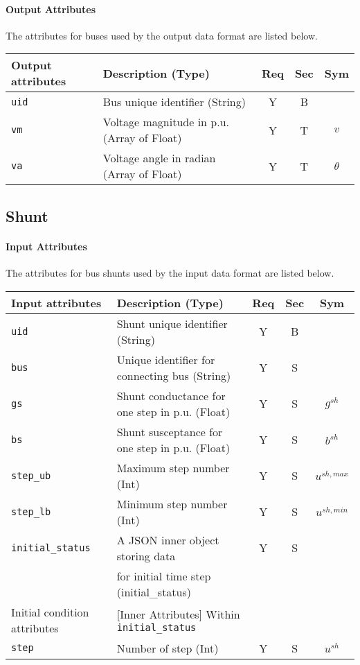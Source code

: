 \documentclass{article}
\begin{document}
\paragraph{Output Attributes} The attributes for buses used by the output data format are listed below.

\begin{center}
\small
\begin{tabular}{ l | l | c | c | c |}
Output attributes & Description (Type) & Req & Sec & Sym\\
\hline
  {\tt uid} & Bus unique identifier (String) & Y & B & \\
  
  {\tt vm} & Voltage magnitude in p.u. (Array of Float)  & Y & T & $v$ \\
  {\tt va} & Voltage angle in radian (Array of Float)  & Y & T & $\theta$\\
\hline
\end{tabular}
\end{center}



\subsection{Shunt}
\label{nom:shunt}
\paragraph{Input Attributes} The attributes for bus shunts used by the input data format are listed below.
\begin{center}
\small

\begin{tabular}{ l | l | c | c | c | }
Input attributes & Description (Type) & Req & Sec & Sym\\
\hline
  {\tt uid} & Shunt unique identifier (String) & Y & B &  \\
  {\tt bus} & Unique identifier for connecting bus (String) & Y & S &  \\   
  {\tt gs}  & Shunt conductance for one step in p.u. (Float) & Y & S & $g^{sh}$ \\  
  {\tt bs}  & Shunt susceptance for one step in p.u. (Float) & Y & S & $b^{sh}$ \\
  {\tt step\_ub}      & Maximum step number (Int)  & Y & S & $u^{sh,max}$\\
  {\tt step\_lb}      & Minimum step number (Int)  & Y & S & $u^{sh,min}$\\
  {\tt initial\_status} & A JSON inner object storing data  & Y & S &  \\
       & for initial time step (initial\_status) &  &  &  \\
  \hline
  Initial condition attributes & [Inner Attributes] Within {\tt initial\_status} & & & \\
  \hline
  {\tt step}       & Number of step (Int)  & Y  & S &$u^{sh}$\\  
\hline
\end{tabular}
\end{center}
\end{document}
